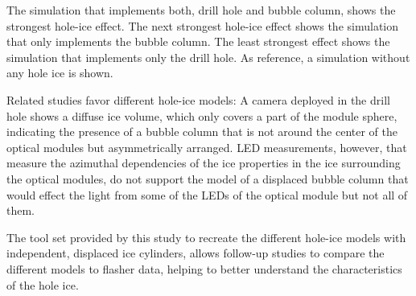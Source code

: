 The simulation that implements both, drill hole and bubble column, shows
the strongest hole-ice effect. The next strongest hole-ice effect shows
the simulation that only implements the bubble column. The least
strongest effect shows the simulation that implements only the drill
hole. As reference, a simulation without any hole ice is shown.

Related studies favor different hole-ice models: A camera deployed in
the drill hole shows a diffuse ice volume, which only covers a part of
the module sphere, indicating the presence of a bubble column that is
not around the center of the optical modules but asymmetrically
arranged. \cite{instrumentation,rongenswedishcamera} LED measurements,
however, that measure the azimuthal dependencies of the ice properties
in the ice surrounding the optical modules, do not support the model of
a displaced bubble column that would effect the light from some of the
LEDs of the optical module but not all of them.
\cite{rongenswedishcamera}

The tool set provided by this study to recreate the different hole-ice
models with independent, displaced ice cylinders, allows follow-up
studies to compare the different models to flasher data, helping to
better understand the characteristics of the hole ice.\followup
